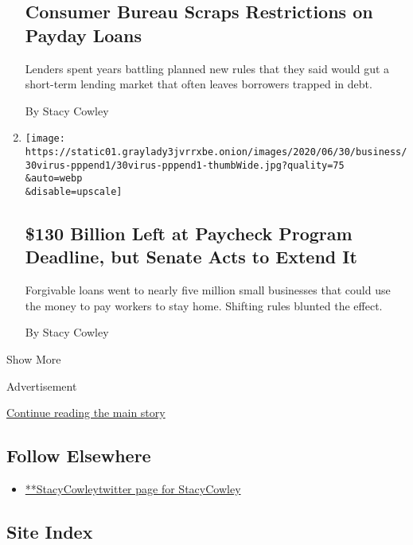 \begin{enumerate}
  \hypertarget{consumer-bureau-scraps-restrictions-on-payday-loans}{%
  \subsection{Consumer Bureau Scraps Restrictions on Payday
  Loans}\label{consumer-bureau-scraps-restrictions-on-payday-loans}}

  Lenders spent years battling planned new rules that they said would
  gut a short-term lending market that often leaves borrowers trapped in
  debt.

  By Stacy Cowley
\item
  \href{/2020/06/30/business/paycheck-protection-program-coronavirus.html}{}

  \texttt{[image: https://static01.graylady3jvrrxbe.onion/images/2020/06/30/business/30virus-pppend1/30virus-pppend1-thumbWide.jpg?quality=75\\\&auto=webp\\\&disable=upscale]}

  \hypertarget{130-billion-left-at-paycheck-program-deadline-but-senate-acts-to-extend-it}{%
  \subsection{\$130 Billion Left at Paycheck Program Deadline, but
  Senate Acts to Extend
  It}\label{130-billion-left-at-paycheck-program-deadline-but-senate-acts-to-extend-it}}

  Forgivable loans went to nearly five million small businesses that
  could use the money to pay workers to stay home. Shifting rules
  blunted the effect.

  By Stacy Cowley
\end{enumerate}

Show More

Advertisement

\protect\hyperlink{after-mid2}{Continue reading the main story}

\hypertarget{follow-elsewhere}{%
\subsection{Follow Elsewhere}\label{follow-elsewhere}}

\begin{itemize}
\tightlist
\item
  \href{https://twitter.com/StacyCowley}{**StacyCowleytwitter page for
  StacyCowley}
\end{itemize}

\hypertarget{site-index}{%
\subsection{Site Index}\label{site-index}}

